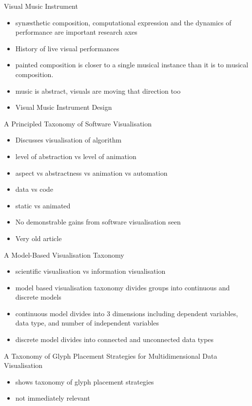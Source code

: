 Visual Music Instrument
\begin{itemize}
\item synæsthetic composition, computational expression and the dynamics of performance are important research axes
\item History of live visual performances
\item painted composition is closer to a single musical instance than it is to musical composition.
\item music is abstract, visuals are moving that direction too
\item Visual Music Instrument Design
\end{itemize}

A Principled Taxonomy of Software Visualisation
\begin{itemize}
\item Discusses visualisation of algorithm
\item level of abstraction vs level of animation
\item aspect vs abstractness vs animation vs automation
\item data vs code
\item static vs animated
\item No demonstrable gains from software visualisation seen
\item Very old article
\end{itemize}

A Model-Based Visualisation Taxonomy
\begin{itemize}
\item scientific visualisation vs information visualisation
\item model based visualisation taxonomy divides groups into continuous and discrete models
\item continuous model divides into 3 dimensions including dependent variables, data type, and number of independent variables
\item discrete model divides into connected and unconnected data types
\end{itemize}

 A Taxonomy of Glyph Placement Strategies for Multidimensional Data Visualisation
 \begin{itemize}
\item shows taxonomy of glyph placement strategies
\item not immediately relevant
\end{itemize}

